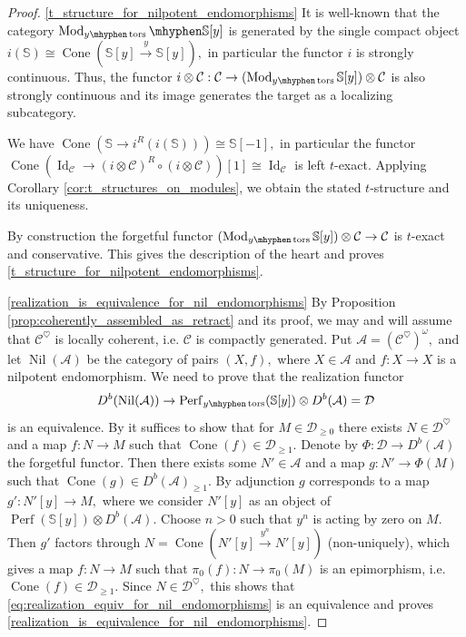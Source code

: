 \documentclass[11pt,leqno]{amsart}
\numberwithin{equation}{section}
\def\bS{\mathbb{S}}
\newcommand{\hy}{\mhyphen}
\newcommand{\xto}{\xrightarrow}
\newcommand{\Cone}{\operatorname{Cone}}
\newcommand{\cD}{{\mathcal D}}
\newcommand{\cA}{{\mathcal A}}
\newcommand{\cC}{{\mathcal C}}
\newcommand{\Perf}{\operatorname{Perf}}
\newcommand{\Id}{\operatorname{Id}}
\newcommand{\tors}{\operatorname{tors}}
\newcommand{\Mod}{\operatorname{Mod}}
\newcommand{\Nil}{\operatorname{Nil}}
\begin{document}
\begin{proof}
	\ref{t_structure_for_nilpotent_endomorphisms} It is well-known that the category $\Mod_{y\hy\tors}\hy \bS[y]$ is generated by the single compact object $i(\bS)\cong \Cone(\bS[y]\xto{y}\bS[y]),$ in particular the functor $i$ is strongly continuous. Thus, the functor $i\otimes \cC:\cC\to (\Mod_{y\hy\tors}\bS[y])\otimes\cC$ is also strongly continuous and its image generates the target as a localizing subcategory. 
	
	We have $\Cone(\bS\to i^R(i(\bS)))\cong \bS[-1],$ in particular the functor $\Cone(\Id_{\cC}\to (i\otimes\cC)^R\circ (i\otimes\cC))[1]\cong \Id_{\cC}$ is left $t$-exact. Applying Corollary \ref{cor:t_structures_on_modules}, we obtain the stated $t$-structure and its uniqueness. 
	
	By construction the forgetful functor $(\Mod_{y\hy\tors}\bS[y])\otimes\cC\to\cC$ is $t$-exact and conservative. This gives the description of the heart and proves
	\ref{t_structure_for_nilpotent_endomorphisms}.
	
	\ref{realization_is_equivalence_for_nil_endomorphisms} By Proposition \ref{prop:coherently_assembled_as_retract} and its proof, we may and will assume that $\cC^{\heartsuit}$ is locally coherent, i.e. $\cC$ is compactly generated. Put $\cA=(\cC^{\heartsuit})^{\omega},$ and let $\Nil(\cA)$ be the category of pairs $(X,f),$ where $X\in\cA$ and $f:X\to X$ is a nilpotent endomorphism. We need to prove that the realization functor
	\begin{equation}\label{eq:realization_equiv_for_nil_endomorphisms}
	D^b(\Nil(\cA))\to \Perf_{y\hy\tors}(\bS[y])\otimes D^b(\cA)=\cD
	\end{equation}
	is an equivalence. By \cite[Lemma 2.1]{Nee21} it suffices to show that for $M\in \cD_{\geq 0}$ there exists $N\in\cD^{\heartsuit}$ and a map $f:N\to M$ such that $\Cone(f)\in\cD_{\geq 1}.$ Denote by $\Phi:\cD\to D^b(\cA)$ the forgetful functor. Then there exists some $N'\in\cA$ and a map $g:N'\to\Phi(M)$ such that $\Cone(g)\in D^b(\cA)_{\geq 1}.$ By adjunction $g$ corresponds to a map $g':N'[y]\to M,$ where we consider $N'[y]$ as an object of $\Perf(\bS[y])\otimes D^b(\cA).$ Choose $n>0$ such that $y^n$ is acting by zero on $M.$ Then $g'$ factors through $N=\Cone(N'[y]\xto{y^n}N'[y])$ (non-uniquely), which gives a map $f:N\to M$ such that $\pi_0(f):N\to\pi_0(M)$ is an epimorphism, i.e. $\Cone(f)\in\cD_{\geq 1}.$ Since $N\in\cD^{\heartsuit},$ this shows that \eqref{eq:realization_equiv_for_nil_endomorphisms} is an equivalence and proves \ref{realization_is_equivalence_for_nil_endomorphisms}.
\end{proof}
\end{document}
